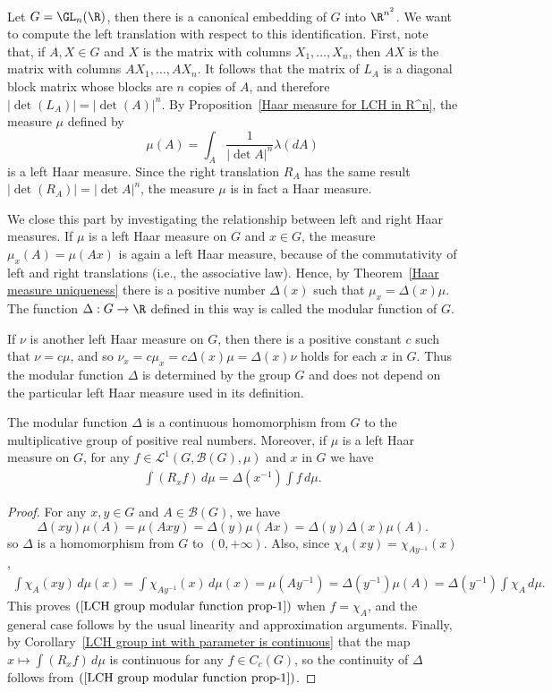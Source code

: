 \begin{example}\label{Haar measure GL_n}
Let $G=\GL_n(\R)$, then there is a canonical embedding of $G$ into $\R^{n^2}$. We want to compute the left translation with respect to this identification. First, note that, if $A,X\in G$ and $X$ is the matrix with columns $X_1,\dots,X_n$, then $AX$ is the matrix with columns $AX_1,\dots,AX_n$. It follows that the matrix of $L_A$ is a diagonal block matrix whose blocks are $n$ copies of $A$, and therefore $|\det(L_A)|=|\det(A)|^n$. By Proposition~\ref{Haar measure for LCH in R^n}, the measure $\mu$ defined by
\[\mu(A)=\int_A\frac{1}{|\det A|^n}\lambda(dA)\]
is a left Haar measure. Since the right translation $R_A$ has the same result $|\det(R_A)|=|\det A|^n$, the measure $\mu$ is in fact a Haar measure.
\end{example}
We close this part by investigating the relationship between left and right Haar measures. If $\mu$ is a left Haar measure on $G$ and $x\in G$, the measure $\mu_x(A)=\mu(Ax)$ is again a left Haar measure, because of the commutativity of left and right translations (i.e., the associative law). Hence, by Theorem~\ref{Haar measure uniqueness} there is a positive number $\Delta(x)$ such that $\mu_x=\Delta(x)\mu$. The function $\Delta:G\to\R$ defined in this way is called the modular function of $G$.\par
If $\nu$ is another left Haar measure on $G$, then there is a positive constant $c$ such that $\nu=c\mu$, and so $\nu_x=c\mu_x=c\Delta(x)\mu=\Delta(x)\nu$ holds for each $x$ in $G$. Thus the modular function $\Delta$ is determined by the group $G$ and does not depend on the particular left Haar measure used in its definition.
\begin{proposition}\label{LCH group modular function prop}
The modular function $\Delta$ is a continuous homomorphism from $G$ to the multiplicative group of positive real numbers. Moreover, if $\mu$ is a left Haar measure on $G$, for any $f\in\mathcal{L}^1(G,\mathcal{B}(G),\mu)$ and $x$ in $G$ we have
\begin{align}\label{LCH group modular function prop-1}
\int(R_xf)\,d\mu=\Delta(x^{-1})\int f\,d\mu.
\end{align}
\end{proposition}
\begin{proof}
For any $x,y\in G$ and $A\in\mathcal{B}(G)$, we have
\[\Delta(xy)\mu(A)=\mu(Axy)=\Delta(y)\mu(Ax)=\Delta(y)\Delta(x)\mu(A).\]
so $\Delta$ is a homomorphism from $G$ to $(0,+\infty)$. Also, since $\chi_{A}(xy)=\chi_{Ay^{-1}}(x)$,
\begin{align*}
\int\chi_A(xy)\,d\mu(x)=\int\chi_{Ay^{-1}}(x)\,d\mu(x)=\mu(Ay^{-1})=\Delta(y^{-1})\mu(A)=\Delta(y^{-1})\int\chi_A\,d\mu.
\end{align*}
This proves $(\ref{LCH group modular function prop-1})$ when $f=\chi_A$, and the general case follows by the usual linearity and approximation arguments. Finally, by Corollary~\ref{LCH group int with parameter is continuous} that the map $x\mapsto\int(R_xf)\,d\mu$ is continuous for any $f\in C_c(G)$, so the continuity of $\Delta$ follows from $(\ref{LCH group modular function prop-1})$.
\end{proof}
